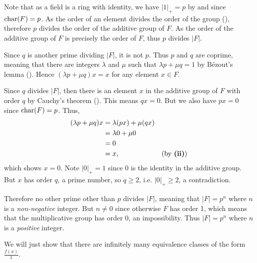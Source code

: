 \begin{questions}
    \item \begin{partquestions}{\roman*}
        \item Note that as a field is a ring with identity, we have $|1|_+ = p$ by  and since $\mathrm{char}(F) = p$. As the order of an element divides the order of the group (), therefore $p$ divides the order of the additive group of $F$. As the order of the additive group of $F$ is precisely the order of $F$, thus $p$ divides $|F|$.

        \item Since $q$ is another prime dividing $|F|$, it is not $p$. Thus $p$ and $q$ are coprime, meaning that there are integers $\lambda$ and $\mu$ such that $\lambda p + \mu q = 1$ by B\'ezout's lemma (). Hence $(\lambda p + \mu q)x = x$ for any element $x \in F$.

        \item Since $q$ divides $|F|$, then there is an element $x$ in the additive group of $F$ with order $q$ by Cauchy's theorem (). This means $qx = 0$. But we also have $px = 0$ since $\mathrm{char}(F) = p$. Thus,
        \begin{align*}
            (\lambda p + \mu q)x &= \lambda (px) + \mu (qx) \\
            &= \lambda 0 + \mu 0\\
            &= 0\\
            &= x, & (\text{by \textbf{(ii)}})
        \end{align*}
        which shows $x = 0$. Note $|0|_+ = 1$ since 0 is the identity in the additive group. But $x$ has order $q$, a prime number, so $q \geq 2$, i.e. $|0|_+ \geq 2$, a contradiction.

        Therefore no other prime other than $p$ divides $|F|$, meaning that $|F| = p^n$ where $n$ is a \textit{non-negative} integer. But $n \neq 0$ since otherwise $F$ has order 1, which means that the multiplicative group has order 0, an impossibility. Thus $|F| = p^n$ where $n$ is a \textit{positive} integer.
    \end{partquestions}

    \item \begin{partquestions}{\alph*}
        \item We will just show that there are infinitely many equivalence classes of the form $\frac{f(x)}1$.


\end{partquestions}
\end{questions}
